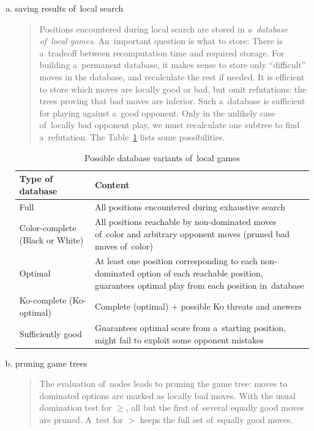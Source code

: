 \begin{enumerate}[(a)]
  \item saving results of~local search
    \begin{quotation}
      Positions encountered during local search are stored in \emph{a~database of~local games}.
      An~important question is what to store:
      There is a~tradeoff between recomputation time and required storage.
      For building a~permanent database, it makes sense to store only ``difficult'' moves in the database, and recalculate the rest if needed.
      It is efficient to store which moves are locally good or bad, but omit refutations:
      the trees proving that bad moves are inferior.
      Such a~database is sufficient for playing against a~good opponent.
      Only in the unlikely case of~locally bad opponent play, we must recalculate one subtree to find a~refutation.
      The Table~\ref{tab:db-loc-games} lists some possibilities.
    \end{quotation}
    \begin{table}[!htbp]
      \centering
      \begin{tabular}{ |p{}|p{}| } 
        \hline
        \textbf{Type of database} & \textbf{Content} \\
        \hline
        Full                            & All positions encountered during exhaustive search \\
        Color-complete (Black or White) & All positions reachable by non-dominated moves of~color and arbitrary opponent moves (pruned bad moves of~color) \\
        Optimal                         & At least one position corresponding to each non-dominated option of each reachable position, guarantees optimal play from each position in~database \\
        Ko-complete (Ko-optimal)        & Complete (optimal) + possible Ko threats and answers \\
        Sufficiently good               & Guarantees optimal score from a~starting position, might fail to exploit some opponent mistakes \\
        \hline
      \end{tabular}
      \caption{Possible database variants of~local games}
      \label{tab:db-loc-games}
    \end{table}

  \item pruning game trees 
    \begin{quotation}
      The evaluation of~nodes leads to pruning the game tree:
      moves to dominated options are marked as locally bad moves.
      With the usual domination test for $\geq$, all but the first of~several equally good moves are pruned.
      A~test for $>$ keeps the full set of~equally good moves.
    \end{quotation}


\end{enumerate}
